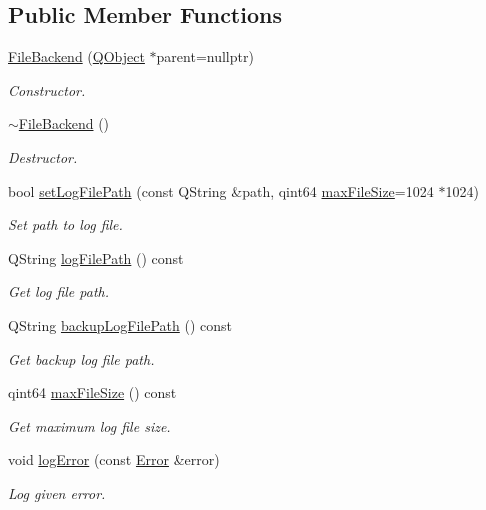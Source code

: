 \subsection*{Public Member Functions}
\begin{DoxyCompactItemize}
\item 
\hyperlink{class_mdt_1_1_error_logger_1_1_file_backend_aac1230ca01a0aeb93731121ee4feaa3a}{File\+Backend} (\hyperlink{class_q_object}{Q\+Object} $\ast$parent=nullptr)
\begin{DoxyCompactList}\small\item\em Constructor. \end{DoxyCompactList}\item 
\hyperlink{class_mdt_1_1_error_logger_1_1_file_backend_a5f7262e481d756d7145bbfa42aeca91e}{$\sim$\+File\+Backend} ()
\begin{DoxyCompactList}\small\item\em Destructor. \end{DoxyCompactList}\item 
bool \hyperlink{class_mdt_1_1_error_logger_1_1_file_backend_a844fc6f89a147b0713700028808e364a}{set\+Log\+File\+Path} (const Q\+String \&path, qint64 \hyperlink{class_mdt_1_1_error_logger_1_1_file_backend_a8c5943cdd59ed5941c72490d7b414359}{max\+File\+Size}=1024 $\ast$1024)
\begin{DoxyCompactList}\small\item\em Set path to log file. \end{DoxyCompactList}\item 
Q\+String \hyperlink{class_mdt_1_1_error_logger_1_1_file_backend_ac25cd41dbbe940bf0247e5054ce8805e}{log\+File\+Path} () const 
\begin{DoxyCompactList}\small\item\em Get log file path. \end{DoxyCompactList}\item 
Q\+String \hyperlink{class_mdt_1_1_error_logger_1_1_file_backend_a7c79c940be2f03f22111638d2e749a64}{backup\+Log\+File\+Path} () const 
\begin{DoxyCompactList}\small\item\em Get backup log file path. \end{DoxyCompactList}\item 
qint64 \hyperlink{class_mdt_1_1_error_logger_1_1_file_backend_a8c5943cdd59ed5941c72490d7b414359}{max\+File\+Size} () const 
\begin{DoxyCompactList}\small\item\em Get maximum log file size. \end{DoxyCompactList}\item 
void \hyperlink{class_mdt_1_1_error_logger_1_1_file_backend_a31b8314d523a491b5441276122daed87}{log\+Error} (const \hyperlink{class_mdt_1_1_error}{Error} \&error)
\begin{DoxyCompactList}\small\item\em Log given error. \end{DoxyCompactList}\end{DoxyCompactItemize}
